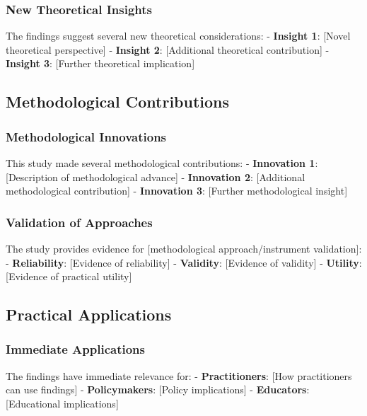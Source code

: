 \documentclass[
  12pt,
  letterpaper,
  12pt,
  letterpaper,
  oneside]{report}
\begin{document}
\subsubsection{New Theoretical Insights}\label{new-theoretical-insights}

The findings suggest several new theoretical considerations: -
\textbf{Insight 1}: {[}Novel theoretical perspective{]} -
\textbf{Insight 2}: {[}Additional theoretical contribution{]} -
\textbf{Insight 3}: {[}Further theoretical implication{]}

\subsection{Methodological
Contributions}\label{methodological-contributions}

\subsubsection{Methodological
Innovations}\label{methodological-innovations}

This study made several methodological contributions: -
\textbf{Innovation 1}: {[}Description of methodological advance{]} -
\textbf{Innovation 2}: {[}Additional methodological contribution{]} -
\textbf{Innovation 3}: {[}Further methodological insight{]}

\subsubsection{Validation of Approaches}\label{validation-of-approaches}

The study provides evidence for {[}methodological approach/instrument
validation{]}: - \textbf{Reliability}: {[}Evidence of reliability{]} -
\textbf{Validity}: {[}Evidence of validity{]} - \textbf{Utility}:
{[}Evidence of practical utility{]}

\subsection{Practical Applications}\label{practical-applications}

\subsubsection{Immediate Applications}\label{immediate-applications}

The findings have immediate relevance for: - \textbf{Practitioners}:
{[}How practitioners can use findings{]} - \textbf{Policymakers}:
{[}Policy implications{]} - \textbf{Educators}: {[}Educational
implications{]}
\end{document}
